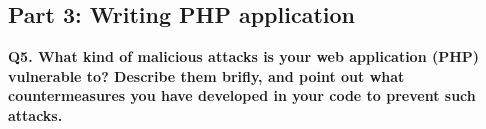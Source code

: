 \subsection {Part 3: Writing PHP application}

{\bf Q5. What kind of malicious attacks is your web application (PHP) vulnerable to? Describe them brifly, and point out what countermeasures you have
developed in your code to prevent such attacks.}









